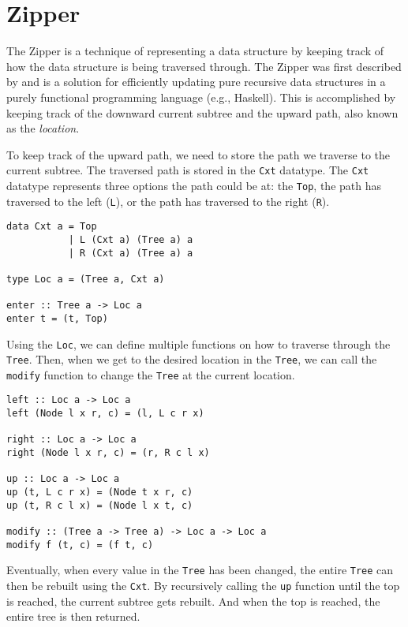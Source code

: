 \section{Zipper}


The Zipper is a technique of representing a data structure by keeping track of how the data structure is being traversed through. The Zipper was first described by \citeauthor{huet1997zipper}\cite{huet1997zipper} and is a solution for efficiently updating pure recursive data structures in a purely functional programming language (e.g., Haskell). This is accomplished by keeping track of the downward current subtree and the upward path, also known as the \textit{location}. 

To keep track of the upward path, we need to store the path we traverse to the current subtree. The traversed path is stored in the \texttt{Cxt} datatype. The \texttt{Cxt} datatype represents three options the path could be at: the \texttt{Top}, the path has traversed to the left (\texttt{L}), or the path has traversed to the right (\texttt{R}).

\begin{verbatim}
data Cxt a = Top
           | L (Cxt a) (Tree a) a
           | R (Cxt a) (Tree a) a

type Loc a = (Tree a, Cxt a)

enter :: Tree a -> Loc a
enter t = (t, Top)           
\end{verbatim}

Using the \texttt{Loc}, we can define multiple functions on how to traverse through the \texttt{Tree}. Then, when we get to the desired location in the \texttt{Tree}, we can call the \texttt{modify} function to change the \texttt{Tree} at the current location.

\begin{verbatim}
left :: Loc a -> Loc a
left (Node l x r, c) = (l, L c r x)

right :: Loc a -> Loc a
right (Node l x r, c) = (r, R c l x)

up :: Loc a -> Loc a
up (t, L c r x) = (Node t x r, c)
up (t, R c l x) = (Node l x t, c)

modify :: (Tree a -> Tree a) -> Loc a -> Loc a
modify f (t, c) = (f t, c)
\end{verbatim}

Eventually, when every value in the \texttt{Tree} has been changed, the entire \texttt{Tree} can then be rebuilt using the \texttt{Cxt}. By recursively calling the \texttt{up} function until the top is reached, the current subtree gets rebuilt. And when the top is reached, the entire tree is then returned.

